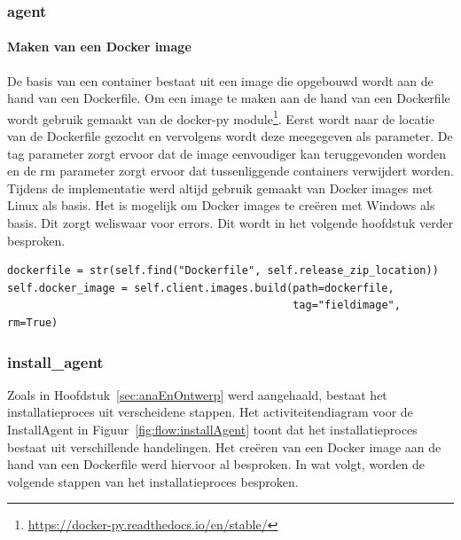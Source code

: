 \subsubsection{agent}
\paragraph{Maken van een Docker image}
De basis van een container bestaat uit een image die opgebouwd wordt aan de hand van een Dockerfile.
Om een image te maken aan de hand van een Dockerfile wordt gebruik gemaakt van de docker-py module\footnote{\url{https://docker-py.readthedocs.io/en/stable/}}.
Eerst wordt naar de locatie van de Dockerfile gezocht en vervolgens wordt deze meegegeven als parameter.
De tag parameter zorgt ervoor dat de image eenvoudiger kan teruggevonden worden en de rm parameter zorgt ervoor dat tussenliggende containers verwijdert worden.
Tijdens de implementatie werd altijd gebruik gemaakt van Docker images met Linux als basis.
Het is mogelijk om Docker images te creëren met Windows als basis.
Dit zorgt weliswaar voor errors.
Dit wordt in het volgende hoofdstuk verder besproken.

\begin{minipage}{\linewidth}
\begin{center}
\begin{lstlisting}[caption={Creatie van een Docker image},label={list:createImage}]
dockerfile = str(self.find("Dockerfile", self.release_zip_location))
self.docker_image = self.client.images.build(path=dockerfile,
                                             tag="fieldimage", rm=True)
\end{lstlisting}
\end{center}
\end{minipage}

\subsubsection{install\_agent}
Zoals in Hoofdstuk~\ref{sec:anaEnOntwerp} werd aangehaald, bestaat het installatieproces uit verscheidene stappen.
Het activiteitendiagram voor de InstallAgent in Figuur~\ref{fig:flow:installAgent} toont dat het installatieproces bestaat uit verschillende handelingen.
Het creëren van een Docker image aan de hand van een Dockerfile werd hiervoor al besproken.
In wat volgt, worden de volgende stappen van het installatieproces besproken.

